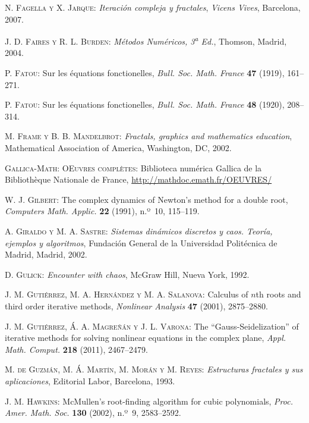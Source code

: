 \begin{thebibliography}{999}
\textsc{N. Fagella y X. Jarque}: 
\textit{Iteración compleja y fractales},
\textit{Vicens Vives}, Barcelona,  2007.


\textsc{J. D. Faires y R. L. Burden}:
\textit{Métodos Numéricos, 3\textsuperscript{a} Ed.}, Thomson, Madrid, 2004.

\textsc{P. Fatou}:
{Sur les équations fonctionelles},
\textit{Bull. Soc. Math. France} \textbf{47} (1919), 161--271.

\textsc{P. Fatou}:
{Sur les équations fonctionelles},
\textit{Bull. Soc. Math. France} \textbf{48} (1920), 208--314.

\textsc{M. Frame y B. B. Mandelbrot}: 
\textit{Fractals, graphics and mathematics education},
{Mathematical Association of America}, Washington, DC,  2002.


\textsc{Gallica-Math: OEuvres complètes}:
Biblioteca numérica Gallica de la Bibliothèque Nationale de France,
\url{http://mathdoc.emath.fr/OEUVRES/}

\textsc{W. J. Gilbert}:
The complex dynamics of Newton's method for a double root,
\textit{Computers Math. Applic.} \textbf{22}  (1991), n.º~10, 115--119.

\textsc{A. Giraldo y M. A. Sastre}:
\textit{Sistemas dinámicos discretos y caos. Teoría, ejemplos y algoritmos},
Fundación General de la Universidad Politécnica de Madrid, Madrid,  2002.

\textsc{D. Gulick}:
\textit{Encounter with chaos},
McGraw Hill, Nueva York,  1992.

\textsc{J. M. Gutiérrez, M. A. Hernández y M. A. Salanova}:
Calculus of $n$th roots and third order iterative methods,
\textit{Nonlinear Analysis} \textbf{47}  (2001), 2875--2880.

\textsc{J. M. Gutiérrez, \'A. A. Magreñán y J. L. Varona}:
The ``Gauss-Seidelization'' of iterative methods for solving nonlinear equations in the complex plane,
\textit{Appl. Math. Comput.} \textbf{218}  (2011), 2467--2479.


\textsc{M. de Guzmán, M. Á. Martín, M. Morán y M. Reyes}:
\textit{Estructuras fractales y sus aplicaciones},
Editorial Labor, Barcelona,  1993.

\textsc{J. M. Hawkins}:
McMullen's root-finding algorithm for cubic polynomials,
\textit{Proc. Amer. Math. Soc.} \textbf{130}  (2002), n.º~9, 2583--2592.


\end{thebibliography}
